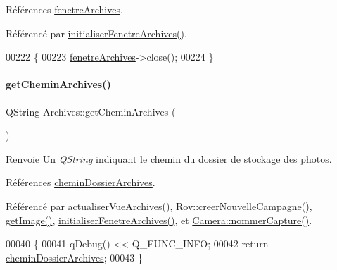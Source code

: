 Références \hyperlink{class_archives_ad7c8209637b01f638b64530020d18b8e}{fenetre\+Archives}.



Référencé par \hyperlink{class_archives_a1842ebad3721929949bc07be5144b79c}{initialiser\+Fenetre\+Archives()}.


\begin{DoxyCode}
00222 \{
00223     \hyperlink{class_archives_ad7c8209637b01f638b64530020d18b8e}{fenetreArchives}->close();
00224 \}
\end{DoxyCode}
\mbox{\label{class_archives_a65dfbaba0123e6530b03bfb70e614c90}} 
\paragraph{\texorpdfstring{get\+Chemin\+Archives()}{getCheminArchives()}}
{\footnotesize\ttfamily Q\+String Archives\+::get\+Chemin\+Archives (\begin{DoxyParamCaption}{ }\end{DoxyParamCaption})}

\begin{DoxyReturn}{Renvoie}
Un {\itshape Q\+String} indiquant le chemin du dossier de stockage des photos. 
\end{DoxyReturn}


Références \hyperlink{class_archives_af155e5062883030cddaa05623a34854b}{chemin\+Dossier\+Archives}.



Référencé par \hyperlink{class_archives_a380ac387d773b07ea5138347dbaca65a}{actualiser\+Vue\+Archives()}, \hyperlink{class_rov_ae1306036b067e9ad50a09f9dd607a092}{Rov\+::creer\+Nouvelle\+Campagne()}, \hyperlink{class_archives_a9e35a0ff2d5823819cd2a9f8019c7b33}{get\+Image()}, \hyperlink{class_archives_a1842ebad3721929949bc07be5144b79c}{initialiser\+Fenetre\+Archives()}, et \hyperlink{class_camera_a60d2c9f16b6f235ab6dd0360c883e0d0}{Camera\+::nommer\+Capture()}.


\begin{DoxyCode}
00040 \{
00041     qDebug() << Q\_FUNC\_INFO;
00042     \textcolor{keywordflow}{return} \hyperlink{class_archives_af155e5062883030cddaa05623a34854b}{cheminDossierArchives};
00043 \}
\end{DoxyCode}
\mbox{\label{class_archives_a5c1d731519acde8b59bc79973c4c1287}} 
